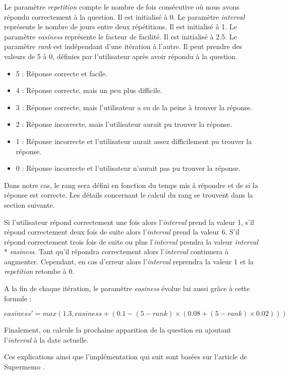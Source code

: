 Le paramètre \emph{repetition} compte le nombre de fois consécutive où nous avons répondu correctement à la question. Il est initialisé à 0.
Le paramètre \emph{interval} représente le nombre de jours entre deux répétitions. Il est initialisé à 1.
Le paramètre \emph{easiness} représente le facteur de facilité. Il est initialisé à 2.5.
Le paramètre \emph{rank} est indépendant d'une itération à l'autre. Il peut prendre des valeurs de 5 à 0, définies par l'utilisateur après avoir répondu à la question.
\begin{itemize}
    \item 5 : Réponse correcte et facile.
    \item 4 : Réponse correcte, mais un peu plus difficile.
    \item 3 : Réponse correcte, mais l'utilisateur a eu de la peine à trouver la réponse.
    \item 2 : Réponse incorrecte, mais l'utilisateur aurait pu trouver la réponse.
    \item 1 : Réponse incorrecte et l'utilisateur aurait assez difficilement pu trouver la réponse.
    \item 0 : Réponse incorrecte et l'utilisateur n'aurait pas pu trouver la réponse.
\end{itemize}
Dans notre cas, le rang sera défini en fonction du temps mis à répondre et de si la réponse est correcte. Les détails concernant le calcul du rang se trouvent dans la section suivante.

Si l'utilisateur répond correctement une fois alors l'\emph{interval} prend la valeur 1, s'il répond correctement deux fois de suite alors l'\emph{interval} prend la valeur 6. S'il répond correctement trois fois de suite ou plus l'\emph{interval} prendra la valeur \emph{interval} * \emph{easiness}. Tant qu'il répondra correctement alors l'\emph{interval} continuera à augmenter. Cependant, en cas d'erreur alors l'\emph{interval} reprendra la valeur 1 et la \emph{repetition} retombe à 0.

A la fin de chaque itération, le paramètre \emph{easiness} évolue lui aussi grâce à cette formule :

\[
    easiness' = max(1.3, easiness + \left(0.1 - (5 - rank) \times \left(0.08 + (5 - rank) \times 0.02\right)\right))
\]

Finalement, on calcule la prochaine apparition de la question en ajoutant l'\emph{interval} à la date actuelle.

Ces explications ainsi que l'implémentation qui suit sont basées sur l'article de Supermemo \cite{supermemo}.


